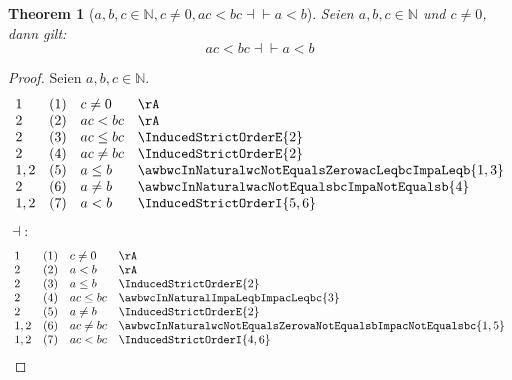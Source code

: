 \documentclass{book}
\theoremstyle{plain}
\newtheorem{theorem}{Theorem}
\theoremstyle{remark}
\theoremstyle{definition}
\begin{document}
\label{awbwcInNaturalwcNotEqualsZerowacLneqbcEqvaLneqb}
\begin{theorem}[\(a,b,c\in\mathbb{N},c\neq 0, ac<bc\dashv\vdash a<b\)]
Seien \(a,b,c\in\mathbb{N}\) und \(c\neq 0\), dann gilt:
\[ac<bc\dashv\vdash a<b\]
\end{theorem}
\begin{proof}
Seien \(a,b,c\in\mathbb{N}\). 
       \[
	\begin{array}{lllcll}
            1       &  (1)  & \multicolumn{3}{l}{c\neq 0} & \rA \\
            2       &  (2)  & \multicolumn{3}{l}{ac<bc} & \rA \\
            2       &  (3)  & \multicolumn{3}{l}{ac\leq bc} & \InducedStrictOrderE{2} \\
            2       &  (4)  & \multicolumn{3}{l}{ac\neq bc} & \InducedStrictOrderE{2} \\
            1,2     &  (5)  & \multicolumn{3}{l}{a\leq b} & \awbwcInNaturalwcNotEqualsZerowacLeqbcImpaLeqb{1,3} \\
            2     &  (6)  & \multicolumn{3}{l}{a\neq b} & \awbwcInNaturalwacNotEqualsbcImpaNotEqualsb{4} \\
            1,2     &  (7)  & \multicolumn{3}{l}{a<b} & \InducedStrictOrderI{5,6} \\

	\end{array}
        \]
\(\dashv\):
       \[
	\begin{array}{lllcll}
            1       &  (1)  & \multicolumn{3}{l}{c\neq 0} & \rA \\
            2       &  (2)  & \multicolumn{3}{l}{a<b} & \rA \\
            2       &  (3)  & \multicolumn{3}{l}{a\leq b} & \InducedStrictOrderE{2} \\
            2       &  (4)  & \multicolumn{3}{l}{ac\leq bc} & \awbwcInNaturalImpaLeqbImpacLeqbc{3} \\
            2       &  (5)  & \multicolumn{3}{l}{a\neq b} & \InducedStrictOrderE{2} \\
            1,2       &  (6)  & \multicolumn{3}{l}{ac\neq bc} & \awbwcInNaturalwcNotEqualsZerowaNotEqualsbImpacNotEqualsbc{1,5} \\
            1,2       &  (7)  & \multicolumn{3}{l}{ac<bc} & \InducedStrictOrderI{4,6} \\
	\end{array}
        \]
\end{proof}
\end{document}
